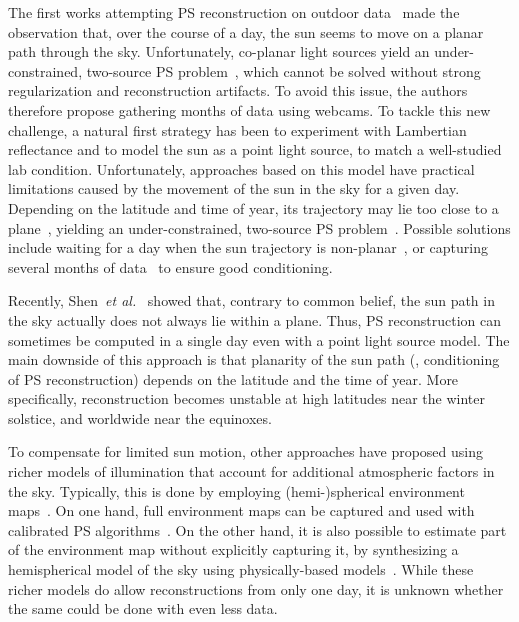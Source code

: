 \documentclass{report}
\begin{document}
The first works attempting PS reconstruction on outdoor data~\cite{ackermann-cvpr-12,abrams-eccv-12} made the observation that, over the course of a day, the sun seems to move on a planar path through the sky. Unfortunately, co-planar light sources yield an under-constrained, two-source PS problem~\cite{hernandez-pami-11}, which cannot be solved without strong regularization and reconstruction artifacts. To avoid this issue, the authors therefore propose gathering months of data using webcams.
To tackle this new challenge, a natural first strategy has been to experiment with Lambertian reflectance and to model the sun as a point light source, to match a well-studied lab condition. Unfortunately, approaches based on this model have practical limitations caused by the movement of the sun in the sky for a given day. Depending on the latitude and time of year, its trajectory may lie too close to a plane~\cite{shen-pg-14}, yielding an under-constrained, two-source PS problem~\cite{hernandez-pami-11}. Possible solutions include waiting for a day when the sun trajectory is non-planar~\cite{shen-pg-14}, or capturing several months of data~\cite{ackermann-cvpr-12,abrams-eccv-12} to ensure good conditioning. 

Recently, Shen~{\em et al.}~\cite{shen-pg-14} showed that, contrary to common belief, the sun path in the sky actually does not always lie within a plane. Thus, PS reconstruction can sometimes be computed in a single day even with a point light source model. The main downside of this approach is that planarity of the sun path (\ie, conditioning of PS reconstruction) depends on the latitude and the time of year. More specifically, reconstruction becomes unstable at high latitudes near the winter solstice, and worldwide near the equinoxes.

To compensate for limited sun motion, other approaches have proposed using richer models of illumination that account for additional atmospheric factors in the sky. Typically, this is done by employing (hemi-)spherical environment maps~\cite{debevec-siggraph-98}. On one hand, full environment maps can be captured and used with calibrated PS algorithms~\cite{yu-iccp-13,shi-3dv-14,hung-wacv-15}. On the other hand, it is also possible to estimate part of the environment map without explicitly capturing it, by synthesizing a hemispherical model of the sky using physically-based models~\cite{inose-tcva-13,jung-cvpr-15}. While these richer models do allow reconstructions from only one day, it is unknown whether the same could be done with even less data. 
\end{document}
